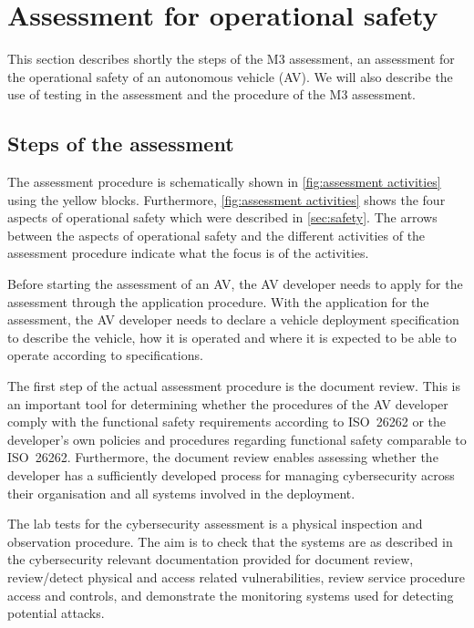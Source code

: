 \section{Assessment for operational safety}
\label{sec:assessment}

This section describes shortly the steps of the M3 assessment, an assessment for the operational safety of an autonomous vehicle (AV). 
We will also describe the use of testing in the assessment and the procedure of the M3 assessment.


\subsection{Steps of the assessment}

The assessment procedure is schematically shown in \cref{fig:assessment activities} using the yellow blocks. Furthermore, \cref{fig:assessment activities} shows the four aspects of operational safety which were described in \cref{sec:safety}. The arrows between the aspects of operational safety and the different activities of the assessment procedure indicate what the focus is of the activities.  

Before  starting the assessment of an AV, the AV developer needs to apply for the assessment through the application procedure. With the application for the assessment, the AV developer needs to declare a vehicle deployment specification to describe the vehicle, how it is operated and where it is expected to be able to operate according to specifications. 


The first step of the actual assessment procedure is the document review. This is an important tool for determining whether the procedures of the AV developer comply with the functional safety requirements according to ISO~26262 or the developer's own policies and procedures regarding functional safety comparable to ISO~26262. Furthermore, the document review enables assessing whether the developer has a sufficiently developed process for managing cybersecurity across their organisation and all systems involved in the deployment. 

The lab tests for the cybersecurity assessment is a physical inspection and observation procedure. The aim is to check that the systems are as described in the cybersecurity relevant documentation provided for document review, review/detect physical and access related vulnerabilities, review service procedure access and controls, and demonstrate the monitoring systems used for detecting potential attacks. 

